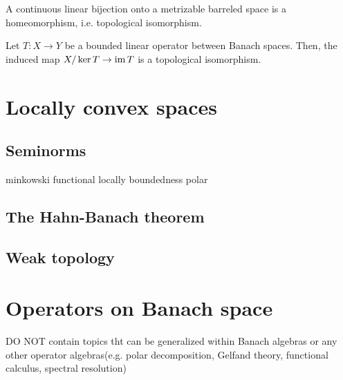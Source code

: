 \documentclass{../crs}
\begin{document}
\begin{cor}
A continuous linear bijection onto a metrizable barreled space is a homeomorphism, i.e. topological isomorphism.
\end{cor}
\begin{cor}
Let $T:X\to Y$ be a bounded linear operator between Banach spaces.
Then, the induced map $X/\ker T\to\im T$ is a topological isomorphism.
\end{cor}















\chapter{Locally convex spaces}
\section{Seminorms}
minkowski functional
locally boundedness
polar

\section{The Hahn-Banach theorem}

\section{Weak topology}



















\chapter{Operators on Banach space}
DO NOT contain topics tht can be generalized within Banach algebras or any other operator algebras(e.g. polar decomposition, Gelfand theory, functional calculus, spectral resolution)
\end{document}
